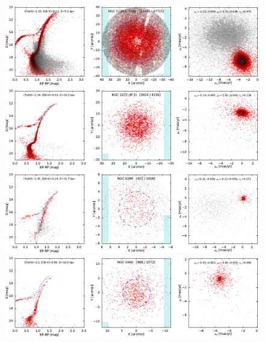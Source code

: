 \documentclass[usenatbib]{mnras}
\begin{document}
\clearpage\begin{figure}
\contcaption{}
\includegraphics{figs/NGC_5139_oCen.pdf}
\includegraphics{figs/NGC_5272_M_3.pdf}
\includegraphics{figs/NGC_5286.pdf}
\includegraphics{figs/NGC_5466.pdf}
\end{figure}
\end{document}
